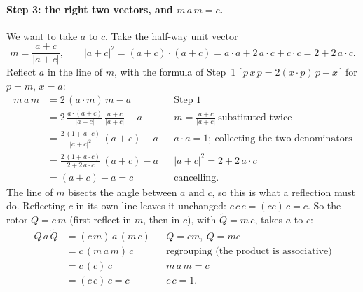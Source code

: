 \paragraph{Step 3: the right two vectors, and $m\,a\,m = c$.} We want to take $a$ to $c$. Take the half-way unit vector
\begin{equation*}
m = \frac{a + c}{|a + c|}, \qquad |a + c|^2 = (a + c)\cdot(a + c) = a\cdot a + 2\,a\cdot c + c\cdot c = 2 + 2\,a\cdot c .
\end{equation*}
Reflect $a$ in the line of $m$, with the formula of Step~1 [\,$p\,x\,p = 2(x\cdot p)\,p - x$\,] for $p = m$, $x = a$:
\begin{align*}
m\, a\, m &= 2\,(a\cdot m)\, m - a && \text{Step 1} \\
&= 2\,\frac{a\cdot(a + c)}{|a + c|}\,\frac{a + c}{|a + c|} - a && m = \tfrac{a + c}{|a + c|}\ \text{substituted twice} \\
&= \frac{2\,(1 + a\cdot c)}{|a + c|^2}\,(a + c) - a && a\cdot a = 1;\ \text{collecting the two denominators} \\
&= \frac{2\,(1 + a\cdot c)}{2 + 2\,a\cdot c}\,(a + c) - a && |a + c|^2 = 2 + 2\,a\cdot c \\
&= (a + c) - a = c && \text{cancelling.}
\end{align*}
The line of $m$ bisects the angle between $a$ and $c$, so this is what a reflection must do. Reflecting $c$ in its own line leaves it unchanged: $c\,c\,c = (cc)\,c = c$. So the rotor $Q = c\,m$ (first reflect in $m$, then in $c$), with $\widetilde Q = m\,c$, takes $a$ to $c$:
\begin{align*}
Q\, a\, \widetilde Q &= (c\, m)\, a\, (m\, c) && Q = cm,\ \widetilde Q = mc \\
&= c\, (m\, a\, m)\, c && \text{regrouping (the product is associative)} \\
&= c\, (c)\, c && m\,a\,m = c \\
&= (c\, c)\, c = c && c\,c = 1 .
\end{align*}

